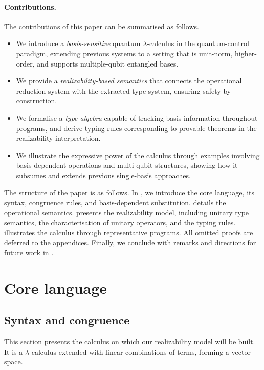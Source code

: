 \documentclass[runningheads,orivec,envcountsame,envcountsect]{llncs}
\begin{document}
\paragraph{Contributions.}
The contributions of this paper can be summarised as follows.
\begin{itemize}
  \item We introduce a \emph{basis-sensitive} quantum $\lambda$-calculus in the
  quantum-control paradigm, extending previous systems to a setting that is
  unit-norm, higher-order, and supports multiple-qubit entangled bases.
  \item We provide a \emph{realizability-based semantics} that connects the
  operational reduction system with the extracted type system, ensuring safety
  by construction.
  \item We formalise a \emph{type algebra} capable of tracking basis
  information throughout programs, and derive typing rules corresponding to
  provable theorems in the realizability interpretation.
  \item We illustrate the expressive power of the calculus through examples
  involving basis-dependent operations and multi-qubit structures, showing how
  it subsumes and extends previous single-basis approaches.
\end{itemize}

The structure of the paper is as follows.  In
, we introduce the core
language, its syntax, congruence rules, and basis-dependent substitution.
 details the
operational semantics.  
presents the realizability model, including
unitary type semantics, the characterisation of unitary operators, and the
typing rules.   illustrates the
calculus through representative programs.  All omitted proofs are deferred to
the appendices.  Finally, we conclude with remarks and directions for future
work in .

\section{Core language}\label{sec:calculus}
\subsection{Syntax and congruence}
This section presents the calculus on which our realizability model will be
built. It is a $\lambda$-calculus extended with linear combinations of terms,
forming a vector space. 
\end{document}
